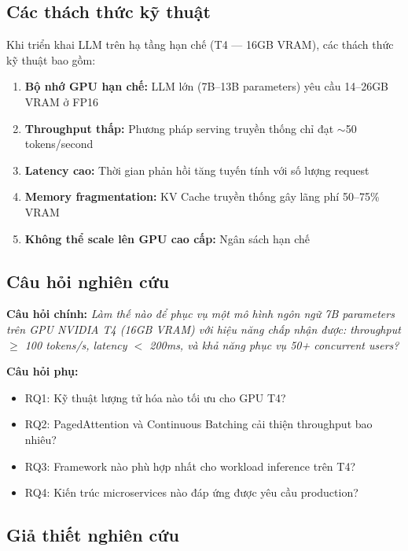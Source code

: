 \documentclass[12pt,a4paper]{report}
\begin{document}
\subsection{Các thách thức kỹ thuật}

Khi triển khai LLM trên hạ tầng hạn chế (T4 --- 16GB VRAM), các thách thức kỹ thuật bao gồm:
\begin{enumerate}
  \item \textbf{Bộ nhớ GPU hạn chế:} LLM lớn (7B--13B parameters) yêu cầu 14--26GB VRAM ở FP16
  \item \textbf{Throughput thấp:} Phương pháp serving truyền thống chỉ đạt $\sim$50 tokens/second
  \item \textbf{Latency cao:} Thời gian phản hồi tăng tuyến tính với số lượng request
  \item \textbf{Memory fragmentation:} KV Cache truyền thống gây lãng phí 50--75\% VRAM
  \item \textbf{Không thể scale lên GPU cao cấp:} Ngân sách hạn chế
\end{enumerate}

\subsection{Câu hỏi nghiên cứu}

\begin{researchbox}
\textbf{Câu hỏi chính:} \textit{Làm thế nào để phục vụ một mô hình ngôn ngữ 7B parameters trên GPU NVIDIA T4 (16GB VRAM) với hiệu năng chấp nhận được: throughput $\geq$ 100 tokens/s, latency $<$ 200ms, và khả năng phục vụ 50+ concurrent users?}

\textbf{Câu hỏi phụ:}
\begin{itemize}
  \item RQ1: Kỹ thuật lượng tử hóa nào tối ưu cho GPU T4?
  \item RQ2: PagedAttention và Continuous Batching cải thiện throughput bao nhiêu?
  \item RQ3: Framework nào phù hợp nhất cho workload inference trên T4?
  \item RQ4: Kiến trúc microservices nào đáp ứng được yêu cầu production?
\end{itemize}
\end{researchbox}

\subsection{Giả thiết nghiên cứu}
\end{document}
